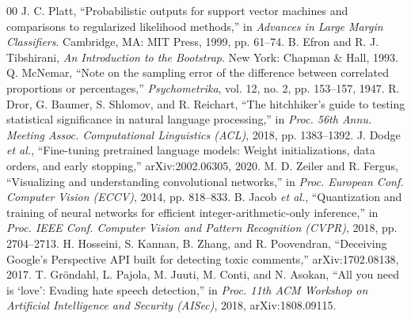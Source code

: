 \documentclass{svproc}
\begin{document}
\begin{thebibliography}{00}
 J. C. Platt, ``Probabilistic outputs for support vector machines and comparisons to regularized likelihood methods,'' in \textit{Advances in Large Margin Classifiers}. Cambridge, MA: MIT Press, 1999, pp. 61--74.
 B. Efron and R. J. Tibshirani, \textit{An Introduction to the Bootstrap}. New York: Chapman \& Hall, 1993.
 Q. McNemar, ``Note on the sampling error of the difference between correlated proportions or percentages,'' \textit{Psychometrika}, vol. 12, no. 2, pp. 153--157, 1947.
 R. Dror, G. Baumer, S. Shlomov, and R. Reichart, ``The hitchhiker's guide to testing statistical significance in natural language processing,'' in \textit{Proc. 56th Annu. Meeting Assoc. Computational Linguistics (ACL)}, 2018, pp. 1383--1392.
 J. Dodge \textit{et al.}, ``Fine-tuning pretrained language models: Weight initializations, data orders, and early stopping,'' arXiv:2002.06305, 2020.
 M. D. Zeiler and R. Fergus, ``Visualizing and understanding convolutional networks,'' in \textit{Proc. European Conf. Computer Vision (ECCV)}, 2014, pp. 818--833.
 B. Jacob \textit{et al.}, ``Quantization and training of neural networks for efficient integer-arithmetic-only inference,'' in \textit{Proc. IEEE Conf. Computer Vision and Pattern Recognition (CVPR)}, 2018, pp. 2704--2713.
 H. Hosseini, S. Kannan, B. Zhang, and R. Poovendran, ``Deceiving Google's Perspective API built for detecting toxic comments,'' arXiv:1702.08138, 2017.
 T. Gr\"ondahl, L. Pajola, M. Juuti, M. Conti, and N. Asokan, ``All you need is `love': Evading hate speech detection,'' in \textit{Proc. 11th ACM Workshop on Artificial Intelligence and Security (AISec)}, 2018, arXiv:1808.09115.
\end{thebibliography}
\end{document}
